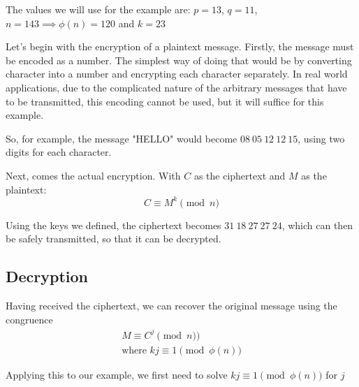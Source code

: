 \documentclass[12pt, titlepage]{article}
\begin{document}
    The values we will use for the example are: $p=13$, $q=11$, $n=143 \implies \phi (n) =
    120$ and $k = 23$

    Let's begin with the encryption of a plaintext message. Firstly, the message must be
    encoded as a number. The simplest way of doing that would be by converting character
    into a number and encrypting each character separately.  In real world applications, due
    to the complicated nature of the arbitrary messages that have to be transmitted, this
    encoding cannot be used, but it will suffice for this example.

    So, for example, the message "HELLO" would become $08\ 05\ 12\ 12\ 15$, using two digits
    for each character.

    Next, comes the actual encryption. With $C$ as the ciphertext and $M$ as the plaintext:
    \begin{equation*}
        C \equiv M^{k} \pmod{n}
    \end{equation*}

    Using the keys we defined, the ciphertext becomes $31\ 18\ 27\ 27\ 24$, which can then
    be safely transmitted, so that it can be decrypted.

    \subsection{Decryption}
    Having received the ciphertext, we can recover the original message using the congruence
    \begin{align*}
        M \equiv C^j \pmod{n})\\
        \text{where } kj \equiv 1 \pmod{\phi (n)}
    \end{align*}

    Applying this to our example, we first need to solve $ kj \equiv 1 \pmod{\phi (n)}$ for
    $j$
\end{document}
